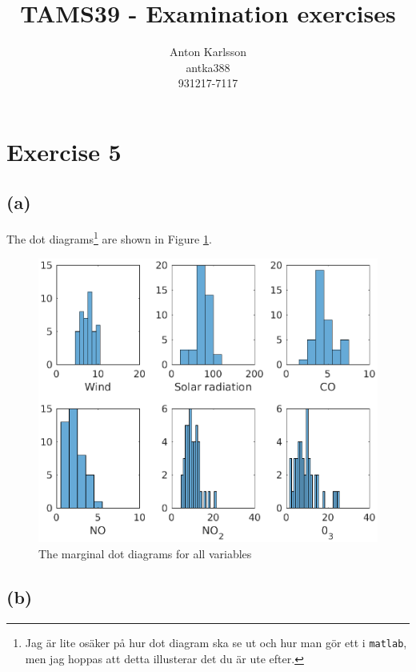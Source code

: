 \message{ !name(examination.tex)}\documentclass[one column]{report}
\title{TAMS39 - Examination exercises}
\author{Anton Karlsson\\antka388\\931217-7117}
\date{}
\begin{document}

\section*{Exercise 5}
\label{sec:exercise5}

\subsection*{(a)}
\label{sec:a-4}

The dot diagrams\footnote{Jag är lite osäker på hur dot diagram ska se
  ut och  hur man gör ett i \texttt{matlab}, men jag
  hoppas att detta illusterar det du är ute efter.} are shown in Figure \ref{fig:ex5-marginalplots}. 

\begin{figure}[h]
  \centering
  \includegraphics[width=13cm]{ex5-marginalplots}
  \caption{The marginal dot diagrams for all variables}
  \label{fig:ex5-marginalplots}
\end{figure}

\subsection*{(b)}
\label{sec:b-4}
\end{document}
